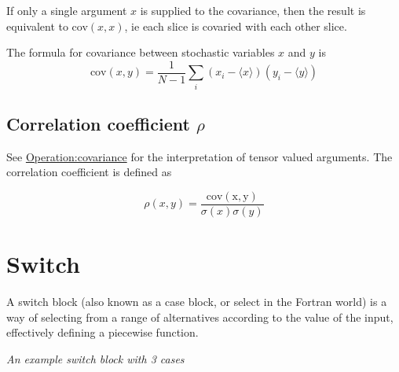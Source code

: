 If only a single argument $x$ is supplied to the covariance, then the
result is equivalent to cov$(x,x)$, ie each slice is covaried with
each other slice.
   
   The formula for covariance between stochastic variables $x$ and $y$
   is
   \begin{displaymath}
     \mathrm{cov}(x,y)=\frac1{N-1}\sum_i(x_i-\langle
     x\rangle)(y_i-\langle y\rangle)
   \end{displaymath}

   \subsection{Correlation coefficient $\rho$}\label{Operation:rho}

   See
   \hyperref{covariance}{covariance (\S}{)}{Operation:covariance}
   for the interpretation of tensor valued arguments. The correlation
   coefficient is defined as

   \begin{displaymath}
     \rho(x,y)=\frac{\mathrm{cov(x,y)}}{\sigma(x)\sigma(y)}
   \end{displaymath}
   

\section{Switch}\label{SwitchIcon}

 A switch block (also known as a case
block, or select in the Fortran world) is a way of selecting from a
range of alternatives according to the value of the input, effectively
defining a piecewise function.

\begin{center}
   {\em
    An example switch block with 3 cases}
\end{center}

